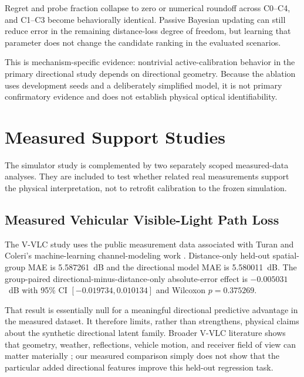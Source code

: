 \documentclass[journal]{IEEEtran}
\begin{document}
\begin{table}[t]
\caption{Distance-only development mechanism ablation.}
\label{tab:distance}
\centering
\small
\resizebox{\columnwidth}{!}{}
\end{table}

Regret and probe fraction collapse to zero or numerical roundoff across C0--C4, and C1--C3 become behaviorally identical. Passive Bayesian updating can still reduce error in the remaining distance-loss degree of freedom, but learning that parameter does not change the candidate ranking in the evaluated scenarios.

This is mechanism-specific evidence: nontrivial active-calibration behavior in the primary directional study depends on directional geometry. Because the ablation uses development seeds and a deliberately simplified model, it is not primary confirmatory evidence and does not establish physical optical identifiability.

\section{Measured Support Studies}
The simulator study is complemented by two separately scoped measured-data analyses. They are included to test whether related real measurements support the physical interpretation, not to retrofit calibration to the frozen simulation.

\begin{table}[t]
\caption{Selected measured-support results and their interpretation.}
\label{tab:support}
\centering
\small
\resizebox{\columnwidth}{!}{}
\end{table}

\subsection{Measured Vehicular Visible-Light Path Loss}
The V-VLC study uses the public measurement data associated with Turan and Coleri's machine-learning channel-modeling work \cite{turan2021}. Distance-only held-out spatial-group MAE is 5.587261~dB and the directional model MAE is 5.580011~dB. The group-paired directional-minus-distance-only absolute-error effect is $-0.005031$~dB with 95\% CI $[-0.019734,0.010134]$ and Wilcoxon $p=0.375269$.

That result is essentially null for a meaningful directional predictive advantage in the measured dataset. It therefore limits, rather than strengthens, physical claims about the synthetic directional latent family. Broader V-VLC literature shows that geometry, weather, reflections, vehicle motion, and receiver field of view can matter materially \cite{karbalayghareh2020,turan2022nlos,mohamed2023,cailean2024}; our measured comparison simply does not show that the particular added directional features improve this held-out regression task.
\end{document}
